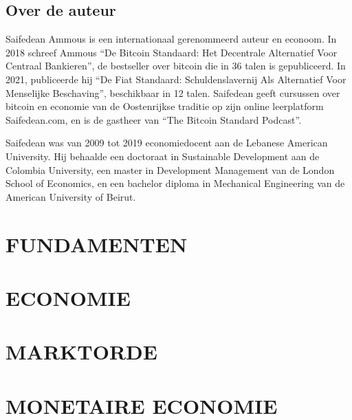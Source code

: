 \documentclass[smalldemyvopaper,11pt,twoside,onecolumn,openright,extrafontsizes]{memoir}
\begin{document}

\chapter{Over de auteur}
Saifedean Ammous is een internationaal gerenommeerd auteur en econoom. In 2018 schreef Ammous \enquote{{De Bitcoin Standaard: Het Decentrale Alternatief Voor Centraal Bankieren}}, de bestseller over bitcoin die in 36 talen is gepubliceerd. In 2021, publiceerde hij \enquote{{De Fiat Standaard: Schuldenslavernij Als Alternatief Voor Menselijke Beschaving}}, beschikbaar in 12 talen. Saifedean geeft cursussen over bitcoin en economie van de Oostenrijkse traditie op zijn online leerplatform Saifedean.com, en is de gastheer van \enquote{{The Bitcoin Standard Podcast}}.

Saifedean was van 2009 tot 2019 economiedocent aan de {Lebanese American University}. Hij behaalde een doctoraat in Sustainable Development aan de {Colombia University}, een master in Development Management van de {London School of Economics}, en een bachelor diploma in Mechanical Engineering van de {American University of Beirut}.



\mainmatter


\part{FUNDAMENTEN}




\part{ECONOMIE}






\part{MARKTORDE}





\part{MONETAIRE ECONOMIE}



\end{document}
